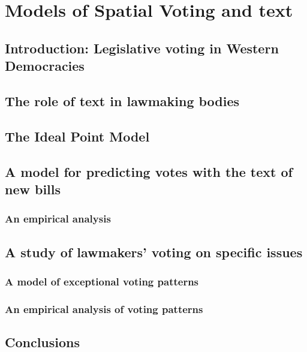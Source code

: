 \chapter{Models of Spatial Voting and text}

\section*{Introduction: Legislative voting in Western Democracies}

\section{The role of text in lawmaking bodies}

\section{The Ideal Point Model}

\section{A model for predicting votes with the text of new bills}

\subsection{An empirical analysis}

\section{A study of lawmakers' voting on specific issues}

\subsection{A model of exceptional voting patterns}

\subsection{An empirical analysis of voting patterns}

\section*{Conclusions}